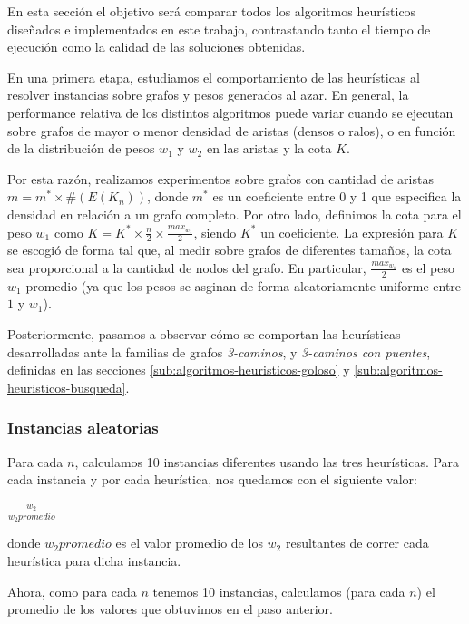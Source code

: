 En esta sección el objetivo será comparar todos los algoritmos heurísticos diseñados e implementados en este trabajo, contrastando tanto el tiempo de ejecución como la calidad de las soluciones obtenidas.


En una primera etapa, estudiamos el comportamiento de las heurísticas al resolver instancias sobre grafos y pesos generados al azar. En general, la performance relativa de los distintos algoritmos puede variar cuando se ejecutan sobre grafos de mayor o menor densidad de aristas (densos o ralos), o en función de la distribución de pesos $w_1$ y $w_2$ en las aristas y la cota $K$.

Por esta razón, realizamos experimentos sobre grafos con cantidad de aristas $m = m^* \times \#(E(K_n))$, donde $m^*$ es un coeficiente entre 0 y 1 que especifica la densidad en relación a un grafo completo. Por otro lado, definimos la cota para el peso $w_1$ como $K = K^* \times \frac{n}{2} \times \frac{max_{w_1}}{2}$, siendo $K^*$ un coeficiente. La expresión para $K$ se escogió de forma tal que, al medir sobre grafos de diferentes tamaños, la cota sea proporcional a la cantidad de nodos del grafo. En particular, $\frac{max_{w_1}}{2}$ es el peso $w_1$ promedio (ya que los pesos se asginan de forma aleatoriamente uniforme entre $1$ y $w_1$).

Posteriormente, pasamos a observar cómo se comportan las heurísticas desarrolladas ante la familias de grafos \emph{3-caminos}, y \emph{3-caminos con puentes}, definidas en las secciones \ref{sub:algoritmos-heuristicos-goloso} y \ref{sub:algoritmos-heuristicos-busqueda}.

\subsubsection{Instancias aleatorias}


Para cada $n$, calculamos 10 instancias diferentes usando las tres heurísticas. Para cada instancia y por cada heurística, nos quedamos con el siguiente valor:

\begin{center}
$\frac{w_2}{w_2 promedio}$
\end{center}

donde $w_2 promedio$ es el valor promedio de los $w_2$ resultantes de correr cada heurística para dicha instancia.

Ahora, como para cada $n$ tenemos 10 instancias, calculamos (para cada $n$) el promedio de los valores que obtuvimos en el paso anterior.

